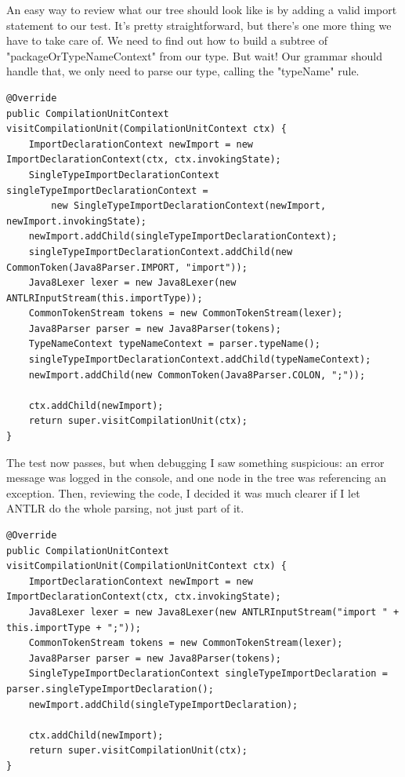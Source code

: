 \documentclass[11pt]{article}
\begin{document}
An easy way to review what our tree should look like is by adding a valid import statement to our test. It's pretty straightforward,
but there's one more thing we have to take care of. We need to find out how to build a subtree of "packageOrTypeNameContext" from our type.
But wait! Our grammar should handle that, we only need to parse our type, calling the "typeName" rule.

\begin{verbatim}
@Override
public CompilationUnitContext visitCompilationUnit(CompilationUnitContext ctx) {
    ImportDeclarationContext newImport = new ImportDeclarationContext(ctx, ctx.invokingState);
    SingleTypeImportDeclarationContext singleTypeImportDeclarationContext =
        new SingleTypeImportDeclarationContext(newImport, newImport.invokingState);
    newImport.addChild(singleTypeImportDeclarationContext);
    singleTypeImportDeclarationContext.addChild(new CommonToken(Java8Parser.IMPORT, "import"));
    Java8Lexer lexer = new Java8Lexer(new ANTLRInputStream(this.importType));
    CommonTokenStream tokens = new CommonTokenStream(lexer);
    Java8Parser parser = new Java8Parser(tokens);
    TypeNameContext typeNameContext = parser.typeName();
    singleTypeImportDeclarationContext.addChild(typeNameContext);
    newImport.addChild(new CommonToken(Java8Parser.COLON, ";"));

    ctx.addChild(newImport);
    return super.visitCompilationUnit(ctx);
}
\end{verbatim}

The test now passes, but when debugging I saw something suspicious: an error message was logged in the console, and one
node in the tree was referencing an exception. Then, reviewing the code, I decided it was much clearer if I let ANTLR
do the whole parsing, not just part of it.

\begin{verbatim}
@Override
public CompilationUnitContext visitCompilationUnit(CompilationUnitContext ctx) {
    ImportDeclarationContext newImport = new ImportDeclarationContext(ctx, ctx.invokingState);
    Java8Lexer lexer = new Java8Lexer(new ANTLRInputStream("import " + this.importType + ";"));
    CommonTokenStream tokens = new CommonTokenStream(lexer);
    Java8Parser parser = new Java8Parser(tokens);
    SingleTypeImportDeclarationContext singleTypeImportDeclaration = parser.singleTypeImportDeclaration();
    newImport.addChild(singleTypeImportDeclaration);

    ctx.addChild(newImport);
    return super.visitCompilationUnit(ctx);
}
\end{verbatim}
\end{document}
